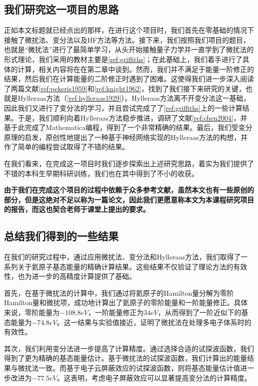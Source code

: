 \subsection{我们研究这一项目的思路}

正如本文标题就已经点出的那样，在进行这个项目时，我们首先在零基础的情况下接触了微扰法、变分法以及HF方法等方法。接下来，我们按照我们项目的题目，也就是“微扰法”进行了最简单学习，从头开始接触量子力学并一直学到了微扰法的形式理论，我们采用的教材主要是\cref{ref:griffiths}；在此基础上，我们着手进行了具体的计算，相关内容将在在第二章中谈到。然而，我们并不满足于能量一阶修正的结果，然后我们在计算能量的二阶修正时遇到了困难。这使得我们进一步深入阅读了两篇文献\cref{ref:pekeris1959}和\cref{ref:knight1962}，找到了我们接下来研究的关键，也就是Hylleraas方法（\cref{ref:hylleraas1929}）。Hylleraas方法离不开变分法这一基础，因此我们又进行了变分法的学习，并且尝试完成了了\cref{ref:griffiths}上的一些计算结果。于是，我们顺利向着Hylleraas方法稳步推进，调研了文献\cref{ref:chen2004}，并基于此完成了Mathematica编程，得到了一个非常精确的结果。最后，我们受变分原理的启发，原创性地提出了一种基于神经网络实现的Hylleraas方法的构想，并作了简单的编程尝试取得了不错的结果。

在我们看来，在完成这一项目时我们逐步探索出上述研究思路，着实为我们提供了不错的本科生早期科研训练，我们也在其中得到了不小的收获。

\textbf{由于我们在完成这个项目的过程中依赖于众多参考文献，虽然本文也有一些原创的部分，但是这绝对不足以称为一篇论文，因此我们更愿意称本文为本课程研究项目的报告，而这也契合老师于课堂上提出的要求。}

\subsection{总结我们得到的一些结果}
在我们的研究过程中，通过应用微扰法、变分法和Hylleraas方法，我们取得了一系列关于氦原子基态能量的精确计算结果。这些结果不仅验证了理论方法的有效性，也为进一步的高精度计算提供了基础。

首先，在基于微扰法的计算中，我们通过将氦原子的Hamilton量分解为零阶Hamilton量和微扰项，成功地计算出了氦原子的零阶能量和一阶能量修正。具体来说，零阶能量为$-108.8 eV$，一阶能量修正为$34 eV$，从而得到了一阶近似下的基态能量为$-74.8 eV$。这一结果与实验值接近，证明了微扰法在处理多电子体系时的有效性。

其次，我们利用变分法进一步提高了计算精度。通过选择合适的试探波函数，我们得到了更为精确的基态能量估计。基于微扰法的试探波函数，我们计算出的能量结果与微扰法一致。而基于电子云屏蔽效应的试探波函数，则将基态能量估计值进一步改进为$-77.5 eV$。这表明，考虑电子屏蔽效应可以显著提高变分法的计算精度。

